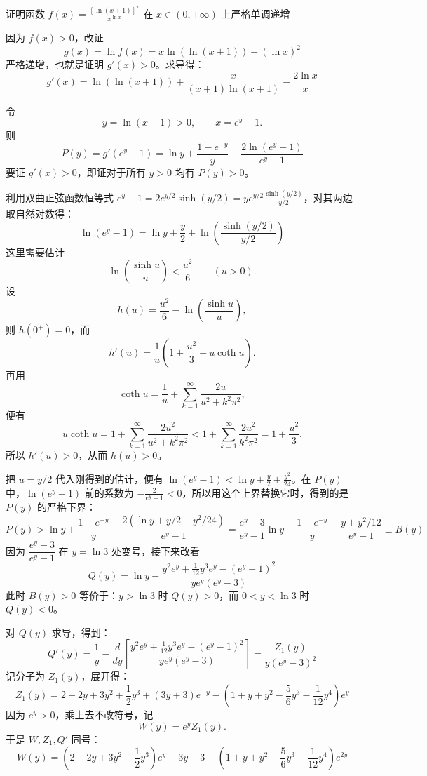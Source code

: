 \begin{example}
    证明函数 $f(x) = \frac{[\ln(x+1)]^x}{x^{\ln x}}$ 在 $x \in (0, +\infty)$ 上严格单调递增
\end{example}
\begin{solution}
因为 $f(x)>0$，改证
\[
g(x)=\ln f(x)=x \ln(\ln(x+1)) - (\ln x)^2
\]
严格递增，也就是证明 $g'(x)>0$。求导得：
$$g'(x) = \ln(\ln(x+1)) + \frac{x}{(x+1)\ln(x+1)} - \frac{2\ln x}{x}$$

令
\[
y = \ln(x+1)>0,\qquad x = e^y - 1.
\]
则
$$P(y) = g'(e^y - 1) = \ln y + \frac{1 - e^{-y}}{y} - \frac{2\ln(e^y - 1)}{e^y - 1}$$
要证 $g'(x) > 0$，即证对于所有 $y > 0$ 均有 $P(y) > 0$。

利用双曲正弦函数恒等式 $e^y - 1 = 2e^{y/2}\sinh(y/2) = y e^{y/2} \frac{\sinh(y/2)}{y/2}$，对其两边取自然对数得：
$$\ln(e^y - 1) = \ln y + \frac{y}{2} + \ln\left(\frac{\sinh(y/2)}{y/2}\right)$$
这里需要估计
\[
\ln\left(\frac{\sinh u}{u}\right) < \frac{u^2}{6}\qquad (u>0).
\]
设
\[
h(u) = \frac{u^2}{6} - \ln\left(\frac{\sinh u}{u}\right),
\]
则 $h(0^+)=0$，而
\[
h'(u) = \frac{1}{u}\left(1 + \frac{u^2}{3} - u \coth u\right).
\]
再用
\[
\coth u = \frac{1}{u} + \sum_{k=1}^\infty \frac{2u}{u^2 + k^2\pi^2},
\]
便有
\[
u \coth u = 1 + \sum_{k=1}^\infty \frac{2u^2}{u^2 + k^2\pi^2}
< 1 + \sum_{k=1}^\infty \frac{2u^2}{k^2\pi^2}
= 1 + \frac{u^2}{3}.
\]
所以 \(h'(u)>0\)，从而 \(h(u)>0\)。

把 \(u=y/2\) 代入刚得到的估计，便有 $\ln(e^y - 1) < \ln y + \frac{y}{2} + \frac{y^2}{24}$。在 $P(y)$ 中，$\ln(e^y-1)$ 前的系数为 $-\frac{2}{e^y-1}<0$，所以用这个上界替换它时，得到的是 $P(y)$ 的严格下界：
$$P(y) > \ln y + \frac{1 - e^{-y}}{y} - \frac{2(\ln y + y/2 + y^2/24)}{e^y - 1} = \frac{e^y - 3}{e^y - 1}\ln y + \frac{1 - e^{-y}}{y} - \frac{y + y^2/12}{e^y - 1} \equiv B(y)$$
因为 $\dfrac{e^y - 3}{e^y - 1}$ 在 $y = \ln 3$ 处变号，接下来改看
$$Q(y) = \ln y - \frac{y^2 e^y + \frac{1}{12}y^3 e^y - (e^y - 1)^2}{y e^y (e^y - 3)}$$
此时 \(B(y)>0\) 等价于：\(y>\ln3\) 时 \(Q(y)>0\)，而 \(0<y<\ln3\) 时 \(Q(y)<0\)。

对 $Q(y)$ 求导，得到：
$$Q'(y) = \frac{1}{y} - \frac{d}{dy}\left[ \frac{y^2 e^y + \frac{1}{12}y^3 e^y - (e^y - 1)^2}{y e^y (e^y - 3)} \right] = \frac{Z_1(y)}{y (e^y - 3)^2}$$
记分子为 $Z_1(y)$，展开得：
$$Z_1(y) = 2 - 2y + 3y^2 + \frac{1}{2}y^3 + (3y + 3)e^{-y} - \left(1 + y + y^2 - \frac{5}{6}y^3 - \frac{1}{12}y^4\right)e^y$$
因为 \(e^y>0\)，乘上去不改符号，记
\[
W(y) = e^y Z_1(y).
\]
于是 \(W,Z_1,Q'\) 同号：
$$W(y) = \left(2 - 2y + 3y^2 + \frac{1}{2}y^3\right)e^y + 3y + 3 - \left(1 + y + y^2 - \frac{5}{6}y^3 - \frac{1}{12}y^4\right)e^{2y}$$


\end{solution}
